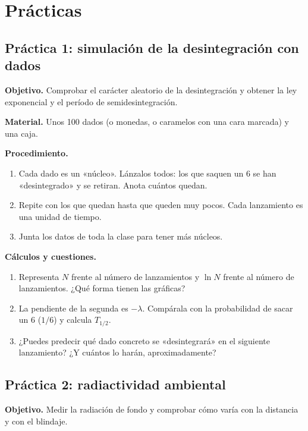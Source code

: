 \section{Prácticas}\label{sec:nuc-practicas}

\subsection{Práctica 1: simulación de la desintegración con dados}\label{subsec:nuc-practica-dados}

\textbf{Objetivo.} Comprobar el carácter aleatorio de la desintegración y obtener la ley exponencial y el período de semidesintegración.

\textbf{Material.} Unos 100 dados (o monedas, o caramelos con una cara marcada) y una caja.

\textbf{Procedimiento.}
\begin{enumerate}[label=\numberballmDarkTeal]
    \item Cada dado es un «núcleo». Lánzalos todos: los que saquen un 6 se han «desintegrado» y se retiran. Anota cuántos quedan.
    \item Repite con los que quedan hasta que queden muy pocos. Cada lanzamiento es una unidad de tiempo.
    \item Junta los datos de toda la clase para tener más núcleos.
\end{enumerate}

\textbf{Cálculos y cuestiones.}
\begin{enumerate}[label=\letraminuscula]
    \item Representa \(N\) frente al número de lanzamientos y \(\ln N\) frente al número de lanzamientos. ¿Qué forma tienen las gráficas?
    \item La pendiente de la segunda es \(-\lambda\). Compárala con la probabilidad de sacar un 6 (\(1/6\)) y calcula \(T_{1/2}\).
    \item ¿Puedes predecir qué dado concreto se «desintegrará» en el siguiente lanzamiento? ¿Y cuántos lo harán, aproximadamente?
\end{enumerate}

\subsection{Práctica 2: radiactividad ambiental}\label{subsec:nuc-practica-contador}

\textbf{Objetivo.} Medir la radiación de fondo y comprobar cómo varía con la distancia y con el blindaje.

